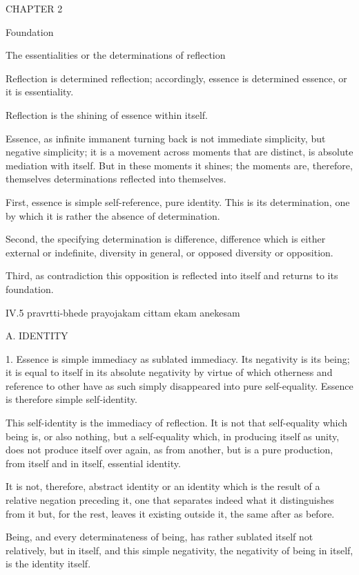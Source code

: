 CHAPTER 2

Foundation

The essentialities or the determinations of reflection

Reflection is determined reflection;
accordingly, essence is determined essence, or it is essentiality.

Reflection is the shining of essence within itself.

Essence, as infinite immanent turning back is
not immediate simplicity, but negative simplicity;
it is a movement across moments that are distinct,
is absolute mediation with itself.
But in these moments it shines;
the moments are, therefore, themselves
determinations reflected into themselves.

First, essence is simple self-reference, pure identity.
This is its determination, one by which it is rather
the absence of determination.

Second, the specifying determination is difference,
difference which is either external or indefinite,
diversity in general, or opposed diversity or opposition.

Third, as contradiction this opposition is reflected into itself
and returns to its foundation.

IV.5
pravrtti-bhede prayojakam cittam ekam anekesam

A. IDENTITY

1. Essence is simple immediacy as sublated immediacy.
Its negativity is its being;
it is equal to itself in its absolute negativity
by virtue of which otherness and reference to other
have as such simply disappeared into pure self-equality.
Essence is therefore simple self-identity.

This self-identity is the immediacy of reflection.
It is not that self-equality which being is, or also nothing,
but a self-equality which, in producing itself as unity,
does not produce itself over again, as from another,
but is a pure production, from itself and in itself,
essential identity.

It is not, therefore, abstract identity
or an identity which is the result
of a relative negation preceding it,
one that separates indeed
what it distinguishes from it
but, for the rest, leaves it existing outside it,
the same after as before.

Being, and every determinateness of being,
has rather sublated itself not relatively,
but in itself, and this simple negativity,
the negativity of being in itself,
is the identity itself.


